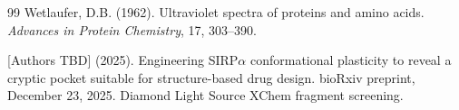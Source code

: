 \documentclass[11pt,twocolumn]{article}
\begin{document}
\begin{thebibliography}{99}
Wetlaufer, D.B. (1962).
Ultraviolet spectra of proteins and amino acids.
\textit{Advances in Protein Chemistry}, 17, 303--390.

[Authors TBD] (2025).
Engineering SIRP$\alpha$ conformational plasticity to reveal a cryptic pocket suitable for structure-based drug design.
bioRxiv preprint, December 23, 2025. Diamond Light Source XChem fragment screening.


\end{thebibliography}
\end{document}
